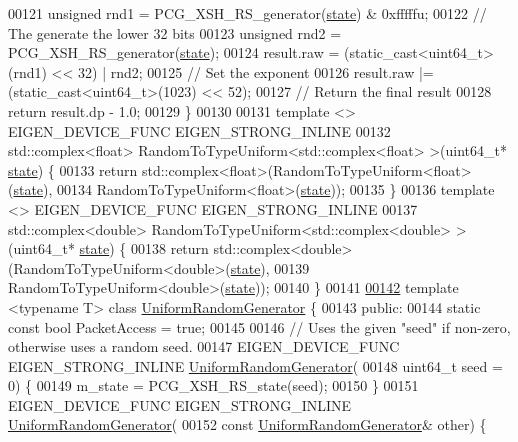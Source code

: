 \begin{DoxyCode}
00121   \textcolor{keywordtype}{unsigned} rnd1 = PCG\_XSH\_RS\_generator(\hyperlink{structstate}{state}) & 0xfffffu;
00122   \textcolor{comment}{// The generate the lower 32 bits}
00123   \textcolor{keywordtype}{unsigned} rnd2 = PCG\_XSH\_RS\_generator(\hyperlink{structstate}{state});
00124   result.raw = (\textcolor{keyword}{static\_cast<}uint64\_t\textcolor{keyword}{>}(rnd1) << 32) | rnd2;
00125   \textcolor{comment}{// Set the exponent}
00126   result.raw |= (\textcolor{keyword}{static\_cast<}uint64\_t\textcolor{keyword}{>}(1023) << 52);
00127   \textcolor{comment}{// Return the final result}
00128   \textcolor{keywordflow}{return} result.dp - 1.0;
00129 \}
00130 
00131 \textcolor{keyword}{template} <> EIGEN\_DEVICE\_FUNC EIGEN\_STRONG\_INLINE
00132 std::complex<float> RandomToTypeUniform<std::complex<float> >(uint64\_t* \hyperlink{structstate}{state}) \{
00133   \textcolor{keywordflow}{return} std::complex<float>(RandomToTypeUniform<float>(\hyperlink{structstate}{state}),
00134                              RandomToTypeUniform<float>(\hyperlink{structstate}{state}));
00135 \}
00136 \textcolor{keyword}{template} <> EIGEN\_DEVICE\_FUNC EIGEN\_STRONG\_INLINE
00137 std::complex<double> RandomToTypeUniform<std::complex<double> >(uint64\_t* \hyperlink{structstate}{state}) \{
00138   \textcolor{keywordflow}{return} std::complex<double>(RandomToTypeUniform<double>(\hyperlink{structstate}{state}),
00139                               RandomToTypeUniform<double>(\hyperlink{structstate}{state}));
00140 \}
00141 
\hyperlink{class_eigen_1_1internal_1_1_uniform_random_generator}{00142} \textcolor{keyword}{template} <\textcolor{keyword}{typename} T> \textcolor{keyword}{class }\hyperlink{class_eigen_1_1internal_1_1_uniform_random_generator}{UniformRandomGenerator} \{
00143  \textcolor{keyword}{public}:
00144   \textcolor{keyword}{static} \textcolor{keyword}{const} \textcolor{keywordtype}{bool} PacketAccess = \textcolor{keyword}{true};
00145 
00146   \textcolor{comment}{// Uses the given "seed" if non-zero, otherwise uses a random seed.}
00147   EIGEN\_DEVICE\_FUNC EIGEN\_STRONG\_INLINE \hyperlink{class_eigen_1_1internal_1_1_uniform_random_generator}{UniformRandomGenerator}(
00148       uint64\_t seed = 0) \{
00149     m\_state = PCG\_XSH\_RS\_state(seed);
00150   \}
00151   EIGEN\_DEVICE\_FUNC EIGEN\_STRONG\_INLINE \hyperlink{class_eigen_1_1internal_1_1_uniform_random_generator}{UniformRandomGenerator}(
00152       \textcolor{keyword}{const} \hyperlink{class_eigen_1_1internal_1_1_uniform_random_generator}{UniformRandomGenerator}& other) \{

\end{DoxyCode}
